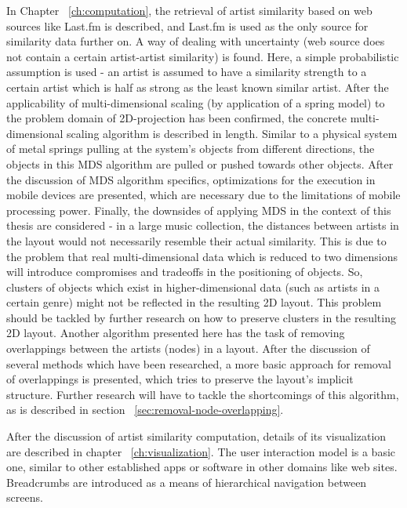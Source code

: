 In Chapter ~\ref{ch:computation}, the retrieval of artist similarity based on web sources like Last.fm is described, and Last.fm is used as the only source for similarity data further on. A way of dealing with uncertainty (web source does not contain a certain artist-artist similarity) is found. Here, a simple probabilistic assumption is used - an artist is assumed to have a similarity strength to a certain artist which is half as strong as the least known similar artist. After the applicability of multi-dimensional scaling (by application of a spring model) to the problem domain of 2D-projection has been confirmed, the concrete multi-dimensional scaling algorithm is described in length. Similar to a physical system of metal springs pulling at the system's objects from different directions, the objects in this MDS algorithm are pulled or pushed towards other objects. After the discussion of MDS algorithm specifics, optimizations for the execution in mobile devices are presented, which are necessary due to the limitations of mobile processing power. Finally, the downsides of applying MDS in the context of this thesis are considered - in a large music collection, the distances between artists in the layout would not necessarily resemble their actual similarity. This is due to the problem that real multi-dimensional data which is reduced to two dimensions will introduce compromises and tradeoffs in the positioning of objects. So, clusters of objects which exist in higher-dimensional data (such as artists in a certain genre) might not be reflected in the resulting 2D layout. This problem should be tackled by further research on how to preserve clusters in the resulting 2D layout.
Another algorithm presented here has the task of removing overlappings between the artists (nodes) in a layout. After the discussion of several methods which have been researched, a more basic approach for removal of overlappings is presented, which tries to preserve the layout's implicit structure. Further research will have to tackle the shortcomings of this algorithm, as is described in section ~\ref{sec:removal-node-overlapping}.

After the discussion of artist similarity computation, details of its visualization are described in chapter ~\ref{ch:visualization}. The user interaction model is a basic one, similar to other established apps or software in other domains like web sites. Breadcrumbs are introduced as a means of hierarchical navigation between screens.

